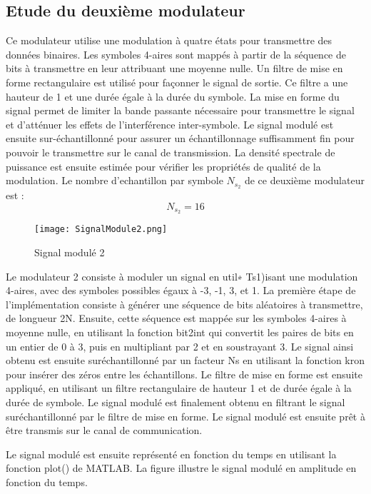 \documentclass[11pt]{article}
\begin{document}
    \subsection{Etude du deuxième modulateur}

Ce modulateur utilise une modulation à quatre états pour transmettre des données binaires. Les symboles 4-aires sont mappés à partir de la séquence de bits à transmettre en leur attribuant une moyenne nulle. Un filtre de mise en forme rectangulaire est utilisé pour façonner le signal de sortie. Ce filtre a une hauteur de 1 et une durée égale à la durée du symbole. La mise en forme du signal permet de limiter la bande passante nécessaire pour transmettre le signal et d'atténuer les effets de l'interférence inter-symbole. Le signal modulé est ensuite sur-échantillonné pour assurer un échantillonnage suffisamment fin pour pouvoir le transmettre sur le canal de transmission. La densité spectrale de puissance est ensuite estimée pour vérifier les propriétés de qualité de la modulation.
Le nombre d'echantillon par symbole $N_s_2$ de ce deuxième modulateur est :
$$ N_s_2 = 16 $$

\begin{figure}[ht!]
            \centering
            \texttt{[image: SignalModule2.png]}
            \caption{Signal modulé 2 \label{fig : SignalModule2}}
        \end{figure}

Le modulateur 2 consiste à moduler un signal en util∗ Ts1)isant une modulation 4-aires, avec des symboles possibles égaux à -3, -1, 3, et 1. La première étape de l'implémentation consiste à générer une séquence de bits aléatoires à transmettre, de longueur 2N. Ensuite, cette séquence est mappée sur les symboles 4-aires à moyenne nulle, en utilisant la fonction bit2int qui convertit les paires de bits en un entier de 0 à 3, puis en multipliant par 2 et en soustrayant 3. Le signal ainsi obtenu est ensuite suréchantillonné par un facteur Ns en utilisant la fonction kron pour insérer des zéros entre les échantillons. Le filtre de mise en forme est ensuite appliqué, en utilisant un filtre rectangulaire de hauteur 1 et de durée égale à la durée de symbole. Le signal modulé est finalement obtenu en filtrant le signal suréchantillonné par le filtre de mise en forme. Le signal modulé est ensuite prêt à être transmis sur le canal de communication.

Le signal modulé est ensuite représenté en fonction du temps en utilisant la fonction plot() de MATLAB. La figure illustre le signal modulé en amplitude en fonction du temps.
\end{document}
